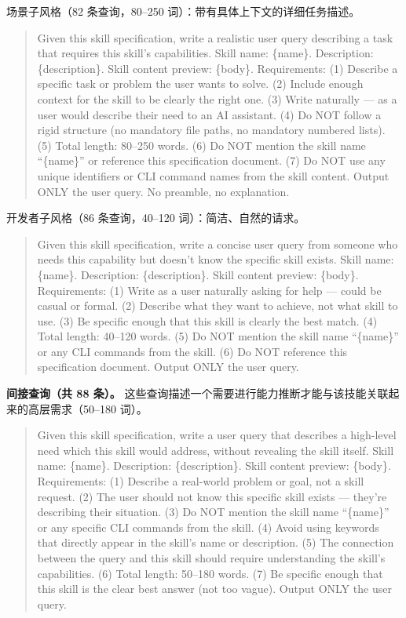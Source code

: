 \documentclass[11pt,UTF8,fontset=fandol]{ctexart}
\begin{document}
场景子风格（82 条查询，80--250 词）：带有具体上下文的详细任务描述。
\begin{quote}\small
Given this skill specification, write a realistic user query describing a task that requires this skill's capabilities. Skill name: \{name\}. Description: \{description\}. Skill content preview: \{body\}. Requirements: (1) Describe a specific task or problem the user wants to solve. (2) Include enough context for the skill to be clearly the right one. (3) Write naturally --- as a user would describe their need to an AI assistant. (4) Do NOT follow a rigid structure (no mandatory file paths, no mandatory numbered lists). (5) Total length: 80--250 words. (6) Do NOT mention the skill name ``\{name\}'' or reference this specification document. (7) Do NOT use any unique identifiers or CLI command names from the skill content. Output ONLY the user query. No preamble, no explanation.
\end{quote}

开发者子风格（86 条查询，40--120 词）：简洁、自然的请求。
\begin{quote}\small
Given this skill specification, write a concise user query from someone who needs this capability but doesn't know the specific skill exists. Skill name: \{name\}. Description: \{description\}. Skill content preview: \{body\}. Requirements: (1) Write as a user naturally asking for help --- could be casual or formal. (2) Describe what they want to achieve, not what skill to use. (3) Be specific enough that this skill is clearly the best match. (4) Total length: 40--120 words. (5) Do NOT mention the skill name ``\{name\}'' or any CLI commands from the skill. (6) Do NOT reference this specification document. Output ONLY the user query.
\end{quote}

\textbf{间接查询（共 88 条）。} 这些查询描述一个需要进行能力推断才能与该技能关联起来的高层需求（50--180 词）。
\begin{quote}\small
Given this skill specification, write a user query that describes a high-level need which this skill would address, without revealing the skill itself. Skill name: \{name\}. Description: \{description\}. Skill content preview: \{body\}. Requirements: (1) Describe a real-world problem or goal, not a skill request. (2) The user should not know this specific skill exists --- they're describing their situation. (3) Do NOT mention the skill name ``\{name\}'' or any specific CLI commands from the skill. (4) Avoid using keywords that directly appear in the skill's name or description. (5) The connection between the query and this skill should require understanding the skill's capabilities. (6) Total length: 50--180 words. (7) Be specific enough that this skill is the clear best answer (not too vague). Output ONLY the user query.
\end{quote}
\end{document}
